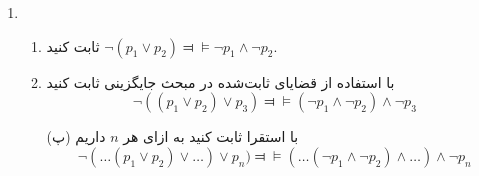 \documentclass[12pt, 14paper]{article}
\begin{document}
\begin{enumerate}
\item
\begin{enumerate}
\item
ثابت کنید
$\neg(p_1\vee p_2)\Dashv\vDash\neg p_1\wedge\neg p_2$.

\item
با استفاده از قضایای ثابت‌شده در مبحث جایگزینی ثابت کنید
$$\neg((p_1\vee p_2)\vee p_3)\Dashv\vDash (\neg p_1 \wedge \neg p_2)\wedge\neg p_3$$

\item[(پ)]
با استقرا ثابت کنید به ازای هر $n$ داریم
$$\neg(\ldots(p_1\vee p_2)\vee \ldots)\vee p_n)\Dashv\vDash (\ldots(\neg p_1\wedge \neg p_2)\wedge\ldots)\wedge\neg p_n$$

\end{enumerate}

\end{enumerate}
\end{document}
